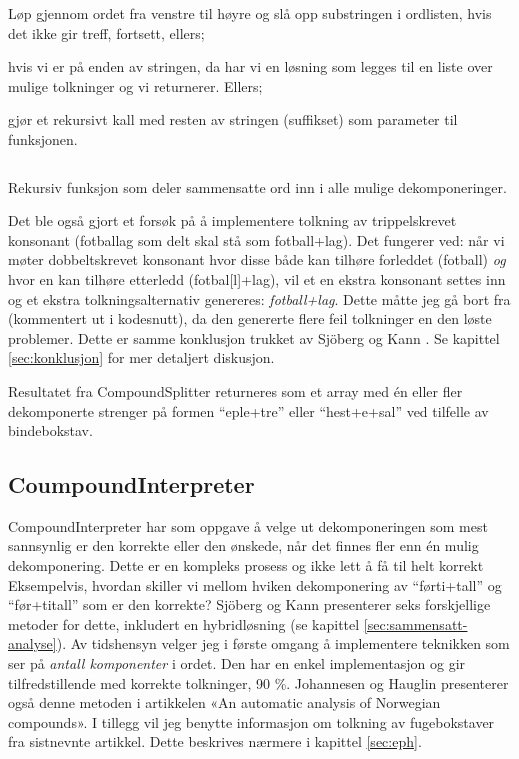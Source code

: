 \begin{items}
\item Løp gjennom ordet fra venstre til høyre og slå opp substringen i ordlisten, hvis det ikke gir treff, fortsett, ellers;
\item hvis vi er på enden av stringen, da har vi en løsning som legges til en liste over mulige tolkninger og vi returnerer. Ellers;
\item gjør et rekursivt kall med resten av stringen (suffikset) som parameter til funksjonen.
\end{items}

\begin{listing}
\inputminted[firstline=30,lastline=68,gobble=4,linenos=true,breaklines=true,bgcolor=bar!10,fontsize=\footnotesize]{ruby}{project/hyphenator/lib/hyphenator/compound_splitter.rb}
\caption[Rekursiv dekomponeringsfunksjon for ord]{Rekursiv funksjon som deler sammensatte ord inn i alle mulige dekomponeringer.}
\label{listing:compound-splitter}
\end{listing}
\clearpage

Det ble også gjort et forsøk på å implementere tolkning av trippelskrevet konsonant (fotballag som delt skal stå som fotball+lag).  Det fungerer ved: når vi møter dobbeltskrevet konsonant hvor disse både kan tilhøre forleddet (fotball) \textit{og} hvor en kan tilhøre etterledd (fotbal[l]+lag), vil et en ekstra konsonant settes inn og et ekstra tolkningsalternativ genereres: \textit{fotball+lag}. Dette måtte jeg gå bort fra (kommentert ut i kodesnutt), da den genererte flere feil tolkninger en den løste problemer. Dette er samme konklusjon trukket av Sjöberg og Kann \cite{sjobergh2004finding}. Se kapittel \ref{sec:konklusjon} for mer detaljert diskusjon.

Resultatet fra CompoundSplitter returneres som et array med én eller fler dekomponerte strenger på formen “eple+tre” eller “hest+e+sal” ved tilfelle av bindebokstav.

\subsection{CoumpoundInterpreter}
\label{sec:comp-int}

CompoundInterpreter har som oppgave å velge ut dekomponeringen som mest sannsynlig er den korrekte eller den ønskede, når det finnes fler enn én mulig dekomponering. Dette er en kompleks prosess og ikke lett å få til helt korrekt Eksempelvis, hvordan skiller vi mellom hviken dekomponering av “førti+tall” og “før+titall” som er den korrekte? Sjöberg og Kann presenterer seks forskjellige metoder for dette, inkludert en hybridløsning (se kapittel \ref{sec:sammensatt-analyse}). Av tidshensyn velger jeg i første omgang å implementere teknikken som ser på \textit{antall komponenter} i ordet. Den har en enkel implementasjon og gir tilfredstillende med korrekte tolkninger, 90 \%. Johannesen og Hauglin presenterer også denne metoden i artikkelen «An automatic analysis of Norwegian compounds»\cite{johannessen1996automatic}. I tillegg vil jeg benytte informasjon om tolkning av fugebokstaver fra sistnevnte artikkel. Dette beskrives nærmere i kapittel \ref{sec:eph}.

